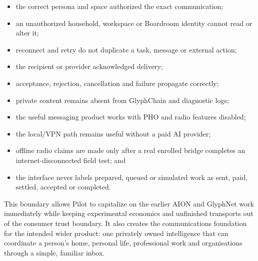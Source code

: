 \begin{itemize}
  \item the correct persona and space authorized the exact communication;
  \item an unauthorized household, workspace or Boardroom identity cannot read
        or alter it;
  \item reconnect and retry do not duplicate a task, message or external action;
  \item the recipient or provider acknowledged delivery;
  \item acceptance, rejection, cancellation and failure propagate correctly;
  \item private content remains absent from GlyphChain and diagnostic logs;
  \item the useful messaging product works with PHO and radio features disabled;
  \item the local/VPN path remains useful without a paid AI provider;
  \item offline radio claims are made only after a real enrolled bridge completes
        an internet-disconnected field test; and
  \item the interface never labels prepared, queued or simulated work as sent,
        paid, settled, accepted or completed.
\end{itemize}

This boundary allows Pilot to capitalize on the earlier AION and GlyphNet work
immediately while keeping experimental economics and unfinished transports out
of the consumer trust boundary. It also creates the communications foundation
for the intended wider product: one privately owned intelligence that can
coordinate a person's home, personal life, professional work and organisations
through a simple, familiar inbox.
